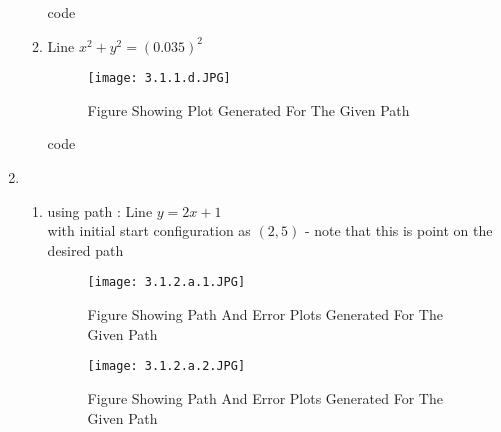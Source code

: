 \documentclass{article}
\begin{document}
\begin{enumerate}
\begin{enumerate}
             code  \\ 
             
            
            \item 
              Line $ x^2 + y^2 = (0.035)^2 $\\ 
                \renewcommand{\thefigure}{3.1.1.d}
                \begin{center}
                    \begin{figure}[H]
                        \centering
                        \texttt{[image: 3.1.1.d.JPG]}
                         \caption{Figure Showing Plot Generated For The Given Path}
                    \end{figure}
                \end{center}
            
             code  \\ 
             
        
        \end{enumerate}

    \item 
        \begin{enumerate}
            \item 
             using path :  Line $ y = 2x + 1$ \\ 
             with initial start configuration as $(2,5)$ - note that this is  point on the desired path
               \renewcommand{\thefigure}{3.1.2.a.1}
                \begin{center}
                    \begin{figure}[H]
                        \centering
                        \texttt{[image: 3.1.2.a.1.JPG]}
                         \caption{Figure Showing Path And Error Plots Generated For The Given Path}
                    \end{figure}
                \end{center}
                \renewcommand{\thefigure}{3.1.2.a.2}
                \begin{center}
                    \begin{figure}[H]
                        \centering
                        \texttt{[image: 3.1.2.a.2.JPG]}
                         \caption{Figure Showing Path And Error Plots Generated For The Given Path}
                    \end{figure}
                \end{center}
            

\end{enumerate}
\end{enumerate}
\end{document}

